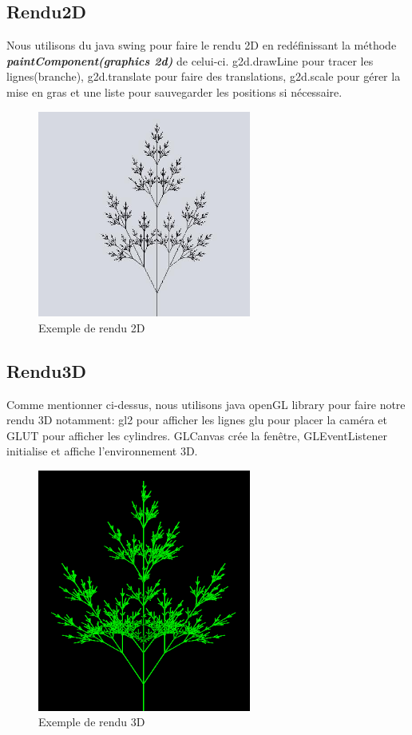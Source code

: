 \subsection{Rendu2D}
Nous utilisons du java swing pour faire le rendu 2D en redéfinissant la méthode \textbf{\textit{paintComponent(graphics 2d)}} de celui-ci. g2d.drawLine pour tracer les lignes(branche), g2d.translate pour faire des translations, g2d.scale pour gérer la mise en gras et une liste pour sauvegarder les positions si nécessaire.
\newpage
	\begin{figure}[h]
		 \centering
		 \includegraphics[width=7cm]{images/arbre2D.jpeg}
		 \caption{Exemple de rendu 2D}
		\end{figure}
	
\subsection{Rendu3D}
Comme mentionner ci-dessus, nous utilisons java openGL library pour faire notre rendu 3D notamment: gl2 pour afficher les lignes
glu pour placer la caméra et GLUT pour afficher les cylindres.
GLCanvas crée la fenêtre, GLEventListener initialise et affiche l’environnement 3D.
\\
	\begin{figure}[h]
		\centering
		\includegraphics[width=7cm]{images/arbre3D.png}
	    \caption{Exemple de rendu 3D }
    \end{figure}
    	
